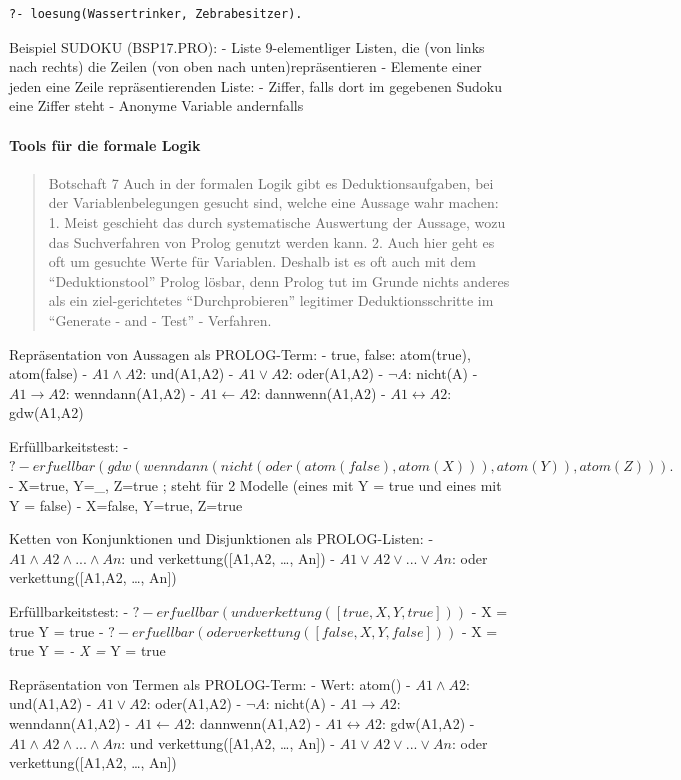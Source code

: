\documentclass[a4paper]{article}
\begin{document}
\begin{multicols}{3}
\begin{verbatim}
?- loesung(Wassertrinker, Zebrabesitzer).
\end{verbatim}

  Beispiel SUDOKU (BSP17.PRO): - Liste 9-elementliger Listen, die (von
  links nach rechts) die Zeilen (von oben nach unten)repräsentieren -
  Elemente einer jeden eine Zeile repräsentierenden Liste: - Ziffer, falls
  dort im gegebenen Sudoku eine Ziffer steht - Anonyme Variable
  andernfalls

  \paragraph{Tools für die formale
    Logik}\label{tools-fuxfcr-die-formale-logik}

  \begin{quote}
    Botschaft 7 Auch in der formalen Logik gibt es Deduktionsaufgaben, bei
    der Variablenbelegungen gesucht sind, welche eine Aussage wahr machen:
    1. Meist geschieht das durch systematische Auswertung der Aussage, wozu
    das Suchverfahren von Prolog genutzt werden kann. 2. Auch hier geht es
    oft um gesuchte Werte für Variablen. Deshalb ist es oft auch mit dem
    ``Deduktionstool'' Prolog lösbar, denn Prolog tut im Grunde nichts
    anderes als ein ziel-gerichtetes ``Durchprobieren'' legitimer
    Deduktionsschritte im ``Generate - and - Test'' - Verfahren.
  \end{quote}

  Repräsentation von Aussagen als PROLOG-Term: - true, false: atom(true),
  atom(false) - $A1\wedge A2$: und(A1,A2) - $A1\vee A2$: oder(A1,A2) -
  $\lnot A$: nicht(A) - $A1\rightarrow A2$: wenndann(A1,A2) -
  $A1\leftarrow A2$: dannwenn(A1,A2) - $A1\leftrightarrow A2$: gdw(A1,A2)

  Erfüllbarkeitstest: -
  $?- erfuellbar(gdw(wenndann(nicht(oder(atom(false),atom(X))),atom(Y)), atom(Z))).$
  - X=true, Y=\_, Z=true ; steht für 2 Modelle (eines mit Y = true und
  eines mit Y = false) - X=false, Y=true, Z=true

  Ketten von Konjunktionen und Disjunktionen als PROLOG-Listen: -
  $A1\wedge A2\wedge ... \wedge An$: und verkettung({[}A1,A2, \ldots{},
  An{]}) - $A1\vee A2\vee ...\vee An$: oder verkettung({[}A1,A2, \ldots{},
  An{]})

  Erfüllbarkeitstest: - $?- erfuellbar(undverkettung([true,X,Y,true]))$ -
  X = true Y = true - $?- erfuellbar(oderverkettung([false,X,Y,false]))$ -
  X = true Y = \emph{ - X = } Y = true

  Repräsentation von Termen als PROLOG-Term: - Wert: atom() -
  $A1\wedge A2$: und(A1,A2) - $A1\vee A2$: oder(A1,A2) - $\lnot A$:
  nicht(A) - $A1\rightarrow A2$: wenndann(A1,A2) - $A1\leftarrow A2$:
  dannwenn(A1,A2) - $A1\leftrightarrow A2$: gdw(A1,A2) -
  $A1\wedge A2\wedge ... \wedge An$: und verkettung({[}A1,A2, \ldots{},
  An{]}) - $A1\vee A2\vee ...\vee An$: oder verkettung({[}A1,A2, \ldots{},
  An{]})


\end{multicols}
\end{document}
